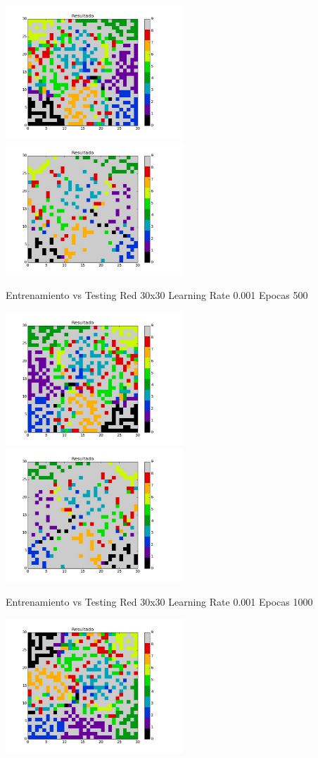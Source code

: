 \includegraphics[width=0.5\textwidth]{img/ej2_train_M_30_lrate_001_epocas_500}
\includegraphics[width=0.5\textwidth]{img/ej2_test_M_30_lrate_001_epocas_500}
{\footnotesize Entrenamiento vs Testing Red 30x30 Learning Rate 0.001 Epocas 500\par}
\includegraphics[width=0.5\textwidth]{img/ej2_train_M_30_lrate_001_epocas_1000}
\includegraphics[width=0.5\textwidth]{img/ej2_test_M_30_lrate_001_epocas_1000}
{\footnotesize Entrenamiento vs Testing Red 30x30 Learning Rate 0.001 Epocas 1000\par}
\includegraphics[width=0.5\textwidth]{img/ej2_train_M_30_lrate_001_epocas_1500}
